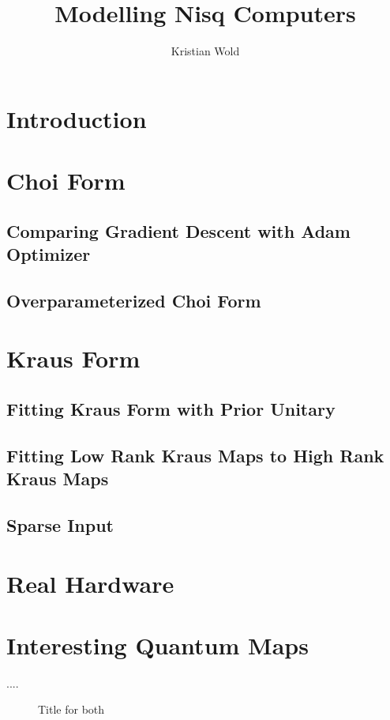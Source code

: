 \documentclass{article}
\title{Modelling Nisq Computers}
\author{Kristian Wold}
\begin{document}
\maketitle

\section{Introduction}

\section{Choi Form}

\subsection{Comparing Gradient Descent with Adam Optimizer}

\subsection{Overparameterized Choi Form}

\section{Kraus Form}

\subsection{Fitting Kraus Form with Prior Unitary}

\subsection{Fitting Low Rank Kraus Maps to High Rank Kraus Maps}

\subsection{Sparse Input}


\section{Real Hardware}

\section{Interesting Quantum Maps}

\usepackage{rotating}
\usepackage{subfigure}
....
\begin{sidewaysfigure}
\caption{Title for both}
\end{sidewaysfigure}
\end{document}
